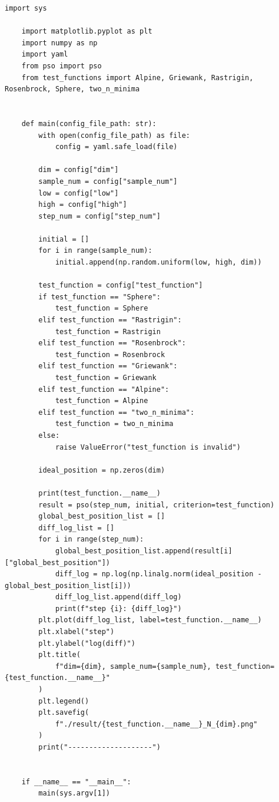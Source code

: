 \documentclass{jsarticle}
\begin{document}
\begin{lstlisting}[caption=main.py]
    import sys

    import matplotlib.pyplot as plt
    import numpy as np
    import yaml
    from pso import pso
    from test_functions import Alpine, Griewank, Rastrigin, Rosenbrock, Sphere, two_n_minima
    
    
    def main(config_file_path: str):
        with open(config_file_path) as file:
            config = yaml.safe_load(file)
    
        dim = config["dim"]
        sample_num = config["sample_num"]
        low = config["low"]
        high = config["high"]
        step_num = config["step_num"]
    
        initial = []
        for i in range(sample_num):
            initial.append(np.random.uniform(low, high, dim))
    
        test_function = config["test_function"]
        if test_function == "Sphere":
            test_function = Sphere
        elif test_function == "Rastrigin":
            test_function = Rastrigin
        elif test_function == "Rosenbrock":
            test_function = Rosenbrock
        elif test_function == "Griewank":
            test_function = Griewank
        elif test_function == "Alpine":
            test_function = Alpine
        elif test_function == "two_n_minima":
            test_function = two_n_minima
        else:
            raise ValueError("test_function is invalid")
    
        ideal_position = np.zeros(dim)
    
        print(test_function.__name__)
        result = pso(step_num, initial, criterion=test_function)
        global_best_position_list = []
        diff_log_list = []
        for i in range(step_num):
            global_best_position_list.append(result[i]["global_best_position"])
            diff_log = np.log(np.linalg.norm(ideal_position - global_best_position_list[i]))
            diff_log_list.append(diff_log)
            print(f"step {i}: {diff_log}")
        plt.plot(diff_log_list, label=test_function.__name__)
        plt.xlabel("step")
        plt.ylabel("log(diff)")
        plt.title(
            f"dim={dim}, sample_num={sample_num}, test_function={test_function.__name__}"
        )
        plt.legend()
        plt.savefig(
            f"./result/{test_function.__name__}_N_{dim}.png"
        )
        print("--------------------")
    
    
    if __name__ == "__main__":
        main(sys.argv[1])
    
\end{lstlisting}
\end{document}
